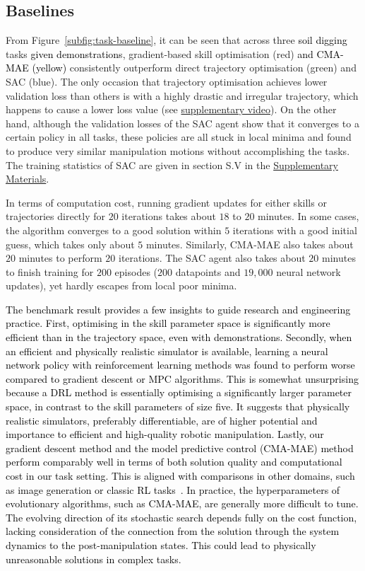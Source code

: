 \documentclass[letterpaper, 10 pt, journal, twoside]{ieeetran}
\newcommand{\rp}[1]{\textcolor{black}{#1}}
\newcommand{\supmat}{\href{https://github.com/IanYangChina/DDBot/blob/main/DDBot_supplementary.pdf}{Supplementary Materials}}
\begin{document}
\subsection{Baselines} 
From Figure~\ref{subfig:task-baseline}, it can be seen that across three \rp{soil digging} tasks \rp{given demonstrations}, gradient-based skill optimisation (red) \rp{and CMA-MAE (yellow)} consistently outperform direct trajectory optimisation (green) and SAC (blue). The only occasion that trajectory optimisation achieves lower validation loss than others is with a highly drastic and irregular trajectory, which happens to cause a lower loss value (see \href{https://www.youtube.com/watch?v=eoNx5V688H0}{supplementary video}). On the other hand, although the validation losses of the SAC agent show that it converges to a certain policy in all tasks, these policies are all stuck in local minima and found to produce very similar manipulation motions without accomplishing the tasks. The training statistics of SAC are given in section S.V in the \supmat. 

In terms of computation cost, running gradient updates for either skills or trajectories directly for $20$ iterations takes about $18$ to $20$ minutes. In some cases, the algorithm converges to a good solution within $5$ iterations with a good initial guess, which takes only about $5$ minutes. Similarly, CMA-MAE also takes about $20$ minutes to perform $20$ iterations. The SAC agent also takes about $20$ minutes to finish training for $200$ episodes ($200$ datapoints and $19,000$ neural network updates), yet hardly escapes from local poor minima. 

\rp{The benchmark result provides a few insights to guide research and engineering practice. First, optimising in the skill parameter space is significantly more efficient than in the trajectory space, even with demonstrations. Secondly, when an efficient and physically realistic simulator is available, learning a neural network policy with reinforcement learning methods was found to perform worse compared to gradient descent or MPC algorithms. This is somewhat unsurprising because a DRL method is essentially optimising a significantly larger parameter space, in contrast to the skill parameters of size five. It suggests that physically realistic simulators, preferably differentiable, are of higher potential and importance to efficient and high-quality robotic manipulation. Lastly, our gradient descent method and the model predictive control (CMA-MAE) method perform comparably well in terms of both solution quality and computational cost in our task setting. This is aligned with comparisons in other domains, such as image generation or classic RL tasks~\cite{zhao2025cmamae-exp}. In practice, the hyperparameters of evolutionary algorithms, such as CMA-MAE, are generally more difficult to tune. The evolving direction of its stochastic search depends fully on the cost function, lacking consideration of the connection from the solution through the system dynamics to the post-manipulation states. This could lead to physically unreasonable solutions in complex tasks.}
\end{document}

